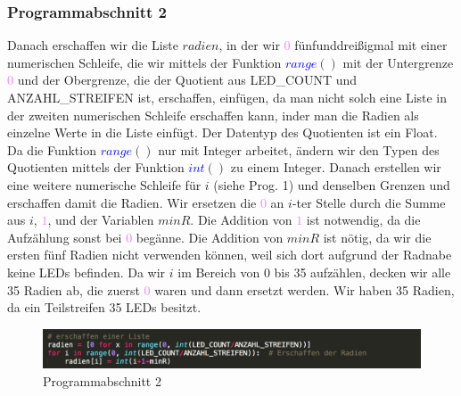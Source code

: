 \documentclass [a4paper, 11pt] {article}
\begin{document}
\subsubsection{Programmabschnitt 2}
Danach erschaffen wir die Liste {$radien$}, in der wir \textcolor{violet}{$0$} fünfunddreißigmal mit einer numerischen Schleife, die wir mittels der Funktion \textcolor{blue}{$range$}{$()$} mit der Untergrenze \textcolor{violet}{$0$} und der Obergrenze, die der Quotient aus LED\_COUNT und ANZAHL\_STREIFEN ist, erschaffen, einfügen, da man nicht solch eine Liste in der zweiten numerischen Schleife erschaffen kann, inder man die Radien als einzelne Werte in die Liste einfügt. Der Datentyp des Quotienten ist ein Float. Da die Funktion \textcolor{blue}{$range$}{$()$} nur mit Integer arbeitet, ändern wir den Typen des Quotienten mittels der Funktion \textcolor{blue}{$int$}{$()$} zu einem Integer. Danach erstellen wir eine weitere numerische Schleife für {$i$} (siehe Prog. 1) und denselben Grenzen und erschaffen damit die Radien. Wir ersetzen die \textcolor{violet}{$0$} an {$i$}-ter Stelle durch die Summe aus {$i$}, \textcolor{violet}{$1$}, und der Variablen {$minR$}. Die Addition von \textcolor{violet}{$1$} ist notwendig, da die Aufzählung sonst bei \textcolor{violet}{$0$} begänne. Die Addition von {$minR$} ist nötig, da wir die ersten fünf Radien nicht verwenden können, weil sich dort aufgrund der Radnabe keine LEDs befinden. 
Da wir {$i$} im Bereich von 0 bis 35 aufzählen, decken wir alle 35 Radien ab, die zuerst \textcolor{violet}{$0$} waren und dann ersetzt werden. Wir haben 35 Radien, da ein Teilstreifen 35 LEDs besitzt.
\begin{figure}[h]
	\centering
	\includegraphics[width=16cm]{P2.png}
	\caption{Programmabschnitt 2}
\end{figure}
\newpage
\end{document}

